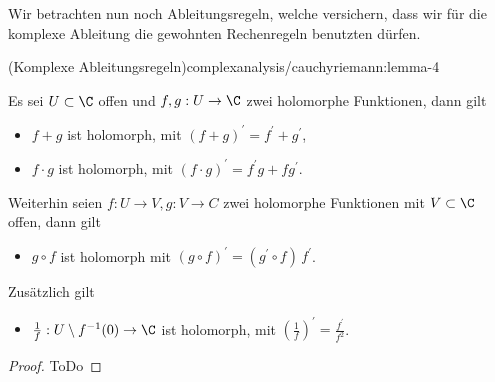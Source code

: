 \documentclass[letterpaper,10pt,german]{jupyterBook}
\begin{document}
\par
Wir betrachten nun noch Ableitungsregeln, welche versichern, dass wir für die komplexe Ableitung die gewohnten Rechenregeln benutzten dürfen.
\begin{lemma}{(Komplexe Ableitungsregeln)}{complexanalysis/cauchyriemann:lemma-4}



\par
Es sei \(U\subset\C\) offen und \(f,g:U\to\C\) zwei holomorphe Funktionen, dann gilt
\begin{itemize}
\item {} 
\par
\(f+g\) ist holomorph, mit \((f+g)^\prime = f^\prime + g^\prime\),

\item {} 
\par
\(f\cdot g\) ist holomorph, mit \((f\cdot g)^\prime = f^\prime g+ f g^\prime\).

\end{itemize}

\par
Weiterhin seien \(f:U\to V, g:V\to C\) zwei holomorphe Funktionen mit \(V\subset\C\) offen, dann gilt
\begin{itemize}
\item {} 
\par
\(g\circ f\) ist holomorph mit \((g\circ f)^\prime = (g^\prime \circ f)\, f^\prime\).

\end{itemize}

\par
Zusätzlich gilt
\begin{itemize}
\item {} 
\par
\(\frac{1}{f}: U\setminus f^{-1}(0)\to \C\) ist holomorph, mit \((\frac{1}{f})^\prime = \frac{f^\prime}{f^2}\).

\end{itemize}
\end{lemma}

\begin{proof}
 ToDo
\end{proof}
\end{document}
